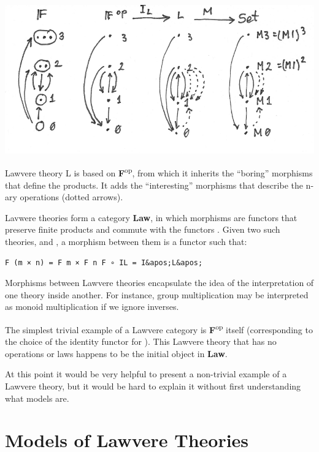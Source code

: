 \hypertarget{attachment_9070}{}
\includegraphics[width=5.31250in]{images/lawvere1.png}

Lawvere theory L is based on \textbf{F}\textsuperscript{op}, from which
it inherits the ``boring'' morphisms that define the products. It adds
the ``interesting'' morphisms that describe the n-ary operations (dotted
arrows).

Lavwere theories form a category \textbf{Law}, in which morphisms are
functors that preserve finite products and commute with the functors
. Given two such theories,  and
, a morphism between them is a
functor  such that:

\begin{verbatim}
F (m × n) = F m × F n F ∘ IL = I&apos;L&apos;
\end{verbatim}

Morphisms between Lawvere theories encapsulate the idea of the
interpretation of one theory inside another. For instance, group
multiplication may be interpreted as monoid multiplication if we ignore
inverses.

The simplest trivial example of a Lawvere category is
\textbf{F}\textsuperscript{op} itself (corresponding to the choice of
the identity functor for ). This Lawvere theory that has no
operations or laws happens to be the initial object in \textbf{Law}.

At this point it would be very helpful to present a non-trivial example
of a Lawvere theory, but it would be hard to explain it without first
understanding what models are.

\section{Models of Lawvere
Theories}\label{models-of-lawvere-theories}

